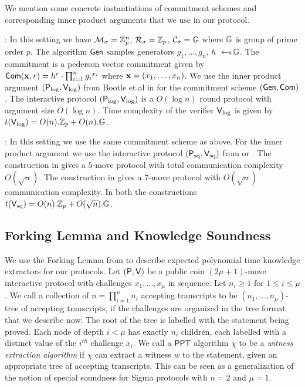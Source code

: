 We mention some concrete instantiations of commitment schemes and corresponding inner product arguments that we use in our protocol.

: In this setting we have $\mathcal{M}_\sigma=\mathbb{Z}^n_p$, $\mathcal{R}_\sigma=\mathbb{Z}_p$, $\mathcal{C}_\sigma=\mathbb{G}$ where $\mathbb{G}$ is group of prime order $p$. The algorithm $\mathsf{Gen}$ samples generators $g_1,\ldots,g_n$, $h$ $\hskip2.3pt{\gets\!\!\mbox{\tiny${\$}$\normalsize}}\, \mathbb{G}$. The commitment is a pederson vector commitment given by $\mathsf{Com}({\bf x } ,r ) = h^r \cdot \prod_{i=1}^n {g_i}^{x_i}$ where ${\bf x}=(x_1,\ldots,x_n)$. We use the inner product argument $(\mathsf{P}_\mathrm{log},\mathsf{V}_\mathrm{log})$ from Bootle et.al in \cite{Bulletproofs} for the commitment scheme $(\mathsf{Gen},\mathsf{Com})$. The interactive protocol $(\mathsf{P}_\mathrm{log},\mathsf{V}_\mathrm{log})$ is a $O(\log n)$ round protocol with argument size $O(\log n)$. Time complexity of the verifier $\mathsf{V}_\mathrm{log}$ is given by $t(\mathsf{V}_\mathrm{log})=O(n).\mathbb{Z}_p + O(n).\mathbb{G}$.\smallskip


: In this setting we use the same commitment scheme as above. For the inner product argument we use the interactive protocol $(\mathsf{P}_\mathrm{sq},\mathsf{V}_\mathrm{sq})$ from \cite{InnerProductDLS} or \cite{Groth09b}. The construction in \cite{InnerProductDLS} gives a $5$-move protocol with total communication complexity $O(\sqrt{n})$. The construction in \cite{Groth09b} gives a 7-move protocol with $O(\sqrt{n})$ communication complexity. In both the constructions $t(\mathsf{V}_\mathrm{sq}) = O(n).\mathbb{Z}_p +
O(\sqrt{n}).\mathbb{G}$.

\subsection{Forking Lemma and Knowledge Soundness}
We use the Forking Lemma from \cite{InnerProductDLS,Bulletproofs} to describe 
expected polynomial time knowledge extractors for our protocols. Let
$(\mathsf{P},\mathsf{V})$ be a public coin $(2\mu+1)$-move interactive protocol with
challenges $x_1,\ldots,x_\mu$ in sequence. Let $n_i\geq 1$ for $1\leq i\leq
\mu$. We call a collection of $n=\prod_{i=1}^\mu n_i$ accepting transcripts to be
$(n_1,\ldots,n_\mu)$-tree of accepting transcripts, if the challenges are
organized in the tree format that we describe now: The root of the tree is
labelled with the statement being proved. Each node of depth $i<\mu$ has exactly
$n_i$ children, each labelled with a distinct value of the $i^{th}$ challenge
$x_i$. We call a $\mathsf{PPT}$ algorithm $\chi$ to be a {\em witness extraction
algorithm} if $\chi$ can extract a witness $w$ to the statement, given an
appropriate tree of accepting transcripts. This can be seen as a generalization
of the notion of special soundness for Sigma protocols with $n=2$ and $\mu=1$.

